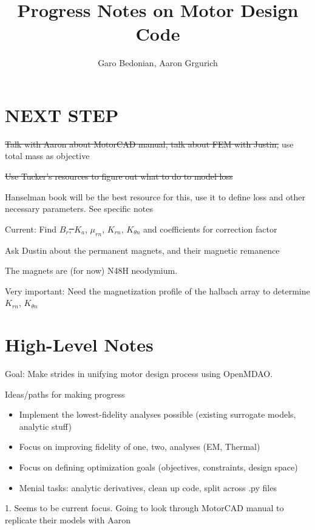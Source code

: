 \documentclass[10pt]{article}
\begin{document}
\title{Progress Notes on Motor Design Code}
\author{Garo Bedonian, Aaron Grgurich}

\maketitle

\section{NEXT STEP}

\sout{Talk with Aaron about MotorCAD manual, talk about FEM with Justin,} use total mass as objective

\sout{Use Tucker's resources to figure out what to do to model loss}

Hanselman book will be the best resource for this, use it to define loss and other necessary parameters. See specific notes

Current: Find \sout{$B_r$, $K_a$}, $\mu_{rn}$, $K_{rn}$, $K_{\theta{}n}$ and coefficients for correction factor

Ask Dustin about the permanent magnets, and their magnetic remanence

The magnets are (for now) N48H neodymium.

Very important: Need the magnetization profile of the halbach array to determine  $K_{rn}$, $K_{\theta{}n}$ 

\section{High-Level Notes}

Goal: Make strides in unifying motor design process using OpenMDAO.

Ideas/paths for making progress 
\begin{itemize}
	\item Implement the lowest-fidelity analyses possible (existing surrogate models, analytic stuff)
	\item Focus on improving fidelity of one, two, analyses (EM, Thermal)
	\item Focus on defining optimization goals (objectives, constraints, design space)
  \item Menial tasks: analytic derivatives, clean up code, split across .py files
\end{itemize}

1. 
Seems to be current focus.
Going to look through MotorCAD manual to replicate their models with Aaron
\end{document}
